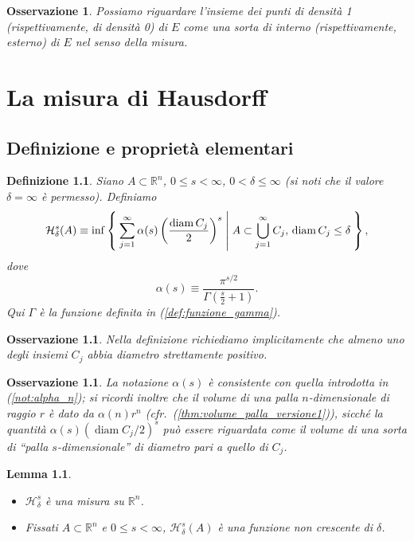 \documentclass[a4paper,10pt,openright,oneside]{book}
\theoremstyle{theoremstyle}
\newtheorem{lemma}[teorema]{Lemma}
\theoremstyle{theoremstylewoheader}
\theoremstyle{theoremstyle}
\newtheorem{definizione}[teorema]{Definizione}
\newtheorem{osservazione}[teorema]{Osservazione}
\theoremstyle{proofsecstyle}
\theoremstyle{nonumberplain}
\newcommand{\RR}{\ensuremath{\mathbb{R}}}
\newcommand{\Haus}{\ensuremath{\mathcal{H}}}
\DeclareMathOperator{\diam}{diam}
\begin{document}
\begin{osservazione}
Possiamo riguardare l'insieme dei punti di densità 1 (rispettivamente, di densità 0) di $E$ come una sorta di \emph{interno} (rispettivamente, \emph{esterno}) di $E$ nel senso della misura.
\end{osservazione}


\chapter{La misura di Hausdorff}

\section{Definizione e proprietà elementari}

\begin{definizione}
\label{def:misura_hausdorff_delta}
Siano $A \subset \RR^n$, $0 \le s < \infty$, $0 < \delta \le \infty$ (si noti che il valore $\delta = \infty$ è permesso). Definiamo
\[
\Haus_\delta^s (A) \equiv \inf\Set{ \sum_{j=1}^\infty \alpha(s) \left(\frac{\diam C_j}{2}\right)^s | A \subset \bigcup_{j=1}^\infty C_j,\, \diam C_j \le \delta },
\]
dove
\[
\alpha(s) \equiv \frac{\pi^{s/2}}{\Gamma(\frac{s}{2} + 1)}.
\]
Qui $\Gamma$ è la funzione definita in (\ref{def:funzione_gamma}).
\end{definizione}

\begin{osservazione}
Nella definizione richiediamo implicitamente che almeno uno degli insiemi $C_j$ abbia diametro strettamente positivo.
\end{osservazione}

\begin{osservazione}
La notazione $\alpha(s)$ è consistente con quella introdotta in (\ref{not:alpha_n}); si ricordi inoltre che il volume di una palla $n$-dimensionale di raggio $r$ è dato da $\alpha(n) r^n$ (\emph{cfr.}~(\ref{thm:volume_palla_versione1})), sicché la quantità $\alpha(s) (\diam C_j/2)^s$ può essere riguardata come il volume di una sorta di ``palla $s$-dimensionale'' di diametro pari a quello di $C_j$. 
\end{osservazione}

\begin{lemma}
\mbox{}
\begin{itemize}
\item[(i)] $\Haus_\delta^s$ è una misura su $\RR^n$.
\item[(ii)] Fissati $A \subset \RR^n$ e $0 \le s < \infty$, $\Haus_\delta^s(A)$ è una funzione non crescente di $\delta$. 
\end{itemize}
\end{lemma}
\end{document}
